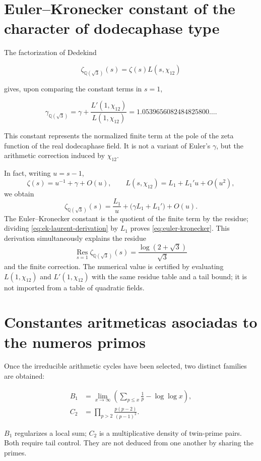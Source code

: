 \section{Euler--Kronecker constant of the character of dodecaphase type}

The factorization of Dedekind

\begin{equation}
\zeta_{\mathbb Q(\sqrt3)}(s)=\zeta(s)L(s,\chi_{12})
\label{eq:dedekind-sqrt3}
\end{equation}

gives, upon comparing the constant terms in \(s=1\),

\begin{equation}
\gamma_{\mathbb Q(\sqrt3)}
=\gamma+\frac{L'(1,\chi_{12})}{L(1,\chi_{12})}
=1.0539656082484825800\ldots.
\label{eq:euler-kronecker}
\end{equation}

This constant represents the normalized finite term at the pole of the
zeta function of the real dodecaphase field. It is not a variant of
Euler's \(\gamma\), but the arithmetic correction induced by
\(\chi_{12}\).

In fact, writing \(u=s-1\),
\[
\zeta(s)=u^{-1}+\gamma+O(u),
\qquad
L(s,\chi_{12})=L_1+L_1'u+O(u^2),
\]
we obtain
\begin{equation}
\zeta_{\mathbb Q(\sqrt3)}(s)
=\frac{L_1}{u}+\bigl(\gamma L_1+L_1'\bigr)+O(u).
\label{eq:ek-laurent-derivation}
\end{equation}
The Euler--Kronecker constant is the quotient of the finite term by
the residue; dividing \cref{eq:ek-laurent-derivation} by \(L_1\) proves
\cref{eq:euler-kronecker}. This derivation simultaneously explains the
residue
\[
\operatorname*{Res}_{s=1}\zeta_{\mathbb Q(\sqrt3)}(s)
=\frac{\log(2+\sqrt3)}{\sqrt3}
\]
and the finite correction. The numerical value is certified by evaluating
\(L(1,\chi_{12})\) and \(L'(1,\chi_{12})\) with the same residue table and a
tail bound; it is not imported from a table of quadratic fields.

\section{Constantes aritmeticas asociadas to the numeros primos}

Once the irreducible arithmetic cycles have been selected, two
distinct families are obtained:

\begin{align}
B_1&=\lim_{x\to\infty}\left(
\sum_{p\le x}\frac1p-\log\log x
\right),
\label{eq:meissel-mertens}\\
C_2&=\prod_{p>2}\frac{p(p-2)}{(p-1)^2}.
\label{eq:twin-prime-constant}
\end{align}

\(B_1\) regularizes a local sum; \(C_2\) is a multiplicative density of twin-prime pairs. Both require tail control. They are not deduced from one another by sharing the primes.

